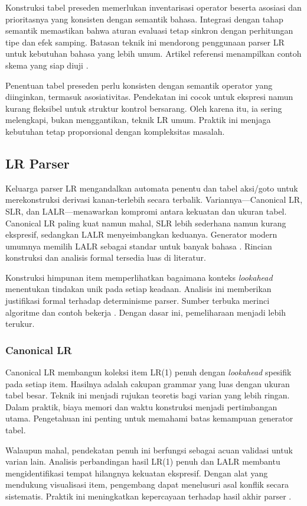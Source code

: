\documentclass[../main.tex]{subfiles}
\begin{document}
Konstruksi tabel preseden memerlukan inventarisasi operator beserta asosiasi dan prioritasnya yang konsisten dengan semantik bahasa. Integrasi dengan tahap semantik memastikan bahwa aturan evaluasi tetap sinkron dengan perhitungan tipe dan efek samping. Batasan teknik ini mendorong penggunaan parser LR untuk kebutuhan bahasa yang lebih umum. Artikel referensi menampilkan contoh skema yang siap diuji \citep{WikiOperatorPrecedence}.

Penentuan tabel preseden perlu konsisten dengan semantik operator yang diinginkan, termasuk asosiativitas. Pendekatan ini cocok untuk ekspresi namun kurang fleksibel untuk struktur kontrol bersarang. Oleh karena itu, ia sering melengkapi, bukan menggantikan, teknik LR umum. Praktik ini menjaga kebutuhan tetap proporsional dengan kompleksitas masalah.

\subsection{LR Parser}
Keluarga parser LR mengandalkan automata penentu dan tabel aksi/goto untuk merekonstruksi derivasi kanan-terlebih secara terbalik. Variannya—Canonical LR, SLR, dan LALR—menawarkan kompromi antara kekuatan dan ukuran tabel. Canonical LR paling kuat namun mahal, SLR lebih sederhana namun kurang ekspresif, sedangkan LALR menyeimbangkan keduanya. Generator modern umumnya memilih LALR sebagai standar untuk banyak bahasa \citep{WikiLR}. Rincian konstruksi dan analisis formal tersedia luas di literatur.

Konstruksi himpunan item memperlihatkan bagaimana konteks \emph{lookahead} menentukan tindakan unik pada setiap keadaan. Analisis ini memberikan justifikasi formal terhadap determinisme parser. Sumber terbuka merinci algoritme dan contoh bekerja \citep{WikiLR}. Dengan dasar ini, pemeliharaan menjadi lebih terukur.

\subsubsection{Canonical LR}
Canonical LR membangun koleksi item LR(1) penuh dengan \emph{lookahead} spesifik pada setiap item. Hasilnya adalah cakupan grammar yang luas dengan ukuran tabel besar. Teknik ini menjadi rujukan teoretis bagi varian yang lebih ringan. Dalam praktik, biaya memori dan waktu konstruksi menjadi pertimbangan utama. Pengetahuan ini penting untuk memahami batas kemampuan generator tabel.

Walaupun mahal, pendekatan penuh ini berfungsi sebagai acuan validasi untuk varian lain. Analisis perbandingan hasil LR(1) penuh dan LALR membantu mengidentifikasi tempat hilangnya kekuatan ekspresif. Dengan alat yang mendukung visualisasi item, pengembang dapat menelusuri asal konflik secara sistematis. Praktik ini meningkatkan kepercayaan terhadap hasil akhir parser \citep{BisonManual}.
\end{document}
